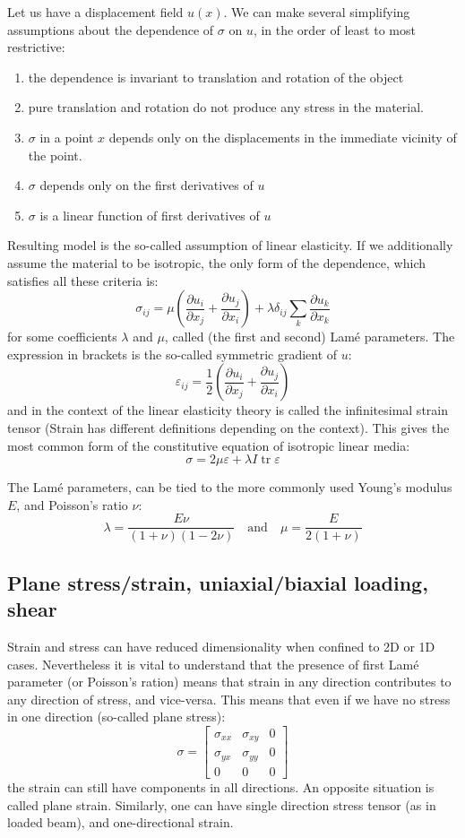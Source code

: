 \documentclass{article}
\newcommand{\mat}[1]{\left[\begin{matrix}#1\end{matrix}\right]}
\DeclareMathOperator{\tr}{tr}
\newcommand{\rr}[2]{\frac{\partial #1}{\partial #2}}
\begin{document}
Let us have a displacement field $u(x)$. We can make several simplifying assumptions about the dependence of $\sigma$ on $u$, in the order of least to most restrictive:
\begin{enumerate}
    \item the dependence is invariant to translation and rotation of the object
    \item pure translation and rotation do not produce any stress in the material.
    \item $\sigma$ in a point $x$ depends only on the displacements in the immediate vicinity of the point.
    \item $\sigma$ depends only on the first derivatives of $u$
    \item $\sigma$ is a linear function of first derivatives of $u$
\end{enumerate}
Resulting model is the so-called assumption of linear elasticity. If we additionally assume the material to be isotropic, the only form of the dependence, which satisfies all these criteria is:
\[\sigma_{ij} = \mu\left(\rr{u_i}{x_j}+\rr{u_j}{x_i}\right) + \lambda\delta_{ij}\sum_k\rr{u_k}{x_k}\]
for some coefficients $\lambda$ and $\mu$, called (the first and second) Lam\'e parameters. The expression in brackets is the so-called symmetric gradient of $u$:
\[\varepsilon_{ij} = \frac{1}{2}\left(\rr{u_i}{x_j}+\rr{u_j}{x_i}\right)\]
and in the context of the linear elasticity theory is called the infinitesimal strain tensor (Strain has different definitions depending on the context). This gives the most common form of the constitutive equation of isotropic linear media:
\[\sigma = 2\mu\varepsilon + \lambda I \tr{\varepsilon}\]

The Lam\'e parameters, can be tied to the more commonly used Young's modulus $E$, and Poisson's ratio $\nu$:
\[\lambda = \frac{E\nu}{(1+\nu)(1-2\nu)}\quad\text{and}\quad\mu=\frac{E}{2(1+\nu)}\]

\subsection{Plane stress/strain, uniaxial/biaxial loading, shear}

Strain and stress can have reduced dimensionality when confined to 2D or 1D cases. Nevertheless it is vital to understand that the presence of first Lam\'e parameter (or Poisson's ration) means that strain in any direction contributes to any direction of stress, and vice-versa. This means that even if we have no stress in one direction (so-called plane stress):
\[\sigma=\mat{
\sigma_{xx}&\sigma_{xy}&0\\
\sigma_{yx}&\sigma_{yy}&0\\
0&0&0}\]
the strain can still have components in all directions. An opposite situation is called plane strain. Similarly, one can have single direction stress tensor (as in loaded beam), and one-directional strain.
\end{document}
